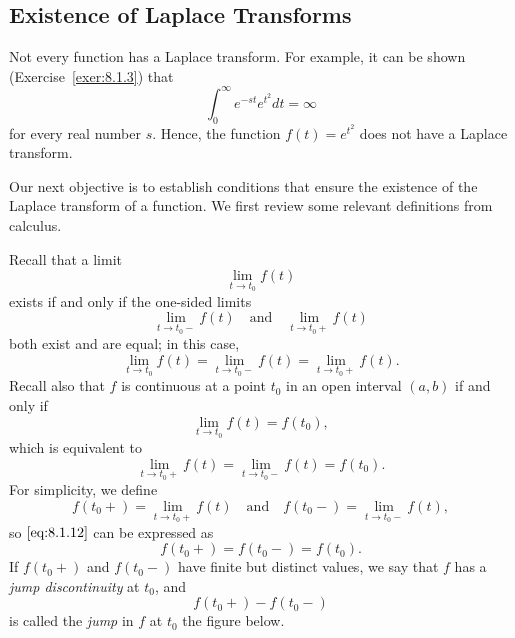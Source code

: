 \documentclass{ximera}
\begin{document}
\subsection*{Existence of Laplace Transforms}

Not every function has a Laplace transform.  For example, it can be shown
(Exercise~\ref{exer:8.1.3}) 
that
$$
\int_0^\infty e^{-st}e^{t^2} dt=\infty
$$
for every real number $s$. Hence, the function $f(t)=e^{t^2}$ does not
have a Laplace transform.

Our next objective is to establish conditions that ensure the
existence of the Laplace transform of a function. We first review some
relevant definitions from calculus.

Recall that a limit
$$
\lim_{t\rightarrow t_0} f(t)
$$
exists if and only if the one-sided limits
$$
\lim_{t\rightarrow t_0-}f(t)\quad\mbox{and}\quad\lim_{t\rightarrow t_0+}f(t)
$$
  both exist and are equal;   in this case,
$$
\lim_{t\rightarrow t_0}f(t)=\lim_{t\rightarrow t_0-}f(t)=\lim_{t\rightarrow t_0+}f(t) .
$$
Recall also that $f$ is continuous at a point $t_0$ in an open interval
$(a,b)$ if and only if
$$
\lim_{t\rightarrow t_0}f(t)=f(t_0),
$$
which is  equivalent to
\begin{equation}\label{eq:8.1.12}
\lim_{t\rightarrow t_0+}f(t)=\lim_{t\rightarrow t_0-}f(t)=f(t_0).
\end{equation}
For simplicity, we  define
$$
f(t_0+)=\lim_{t\rightarrow t_0+}f(t)\quad\mbox{and}\quad f(t_0-)=\lim_{t\rightarrow
t_0-}f(t),
$$
so $\eqref{eq:8.1.12}$ can be expressed as
$$
f(t_0+)=f(t_0-)=f(t_0).
$$
If $f(t_0+)$ and $f(t_0-)$ have finite but distinct values,  we say
that $f$ has a \textit{jump discontinuity}  at $t_0$,
 and
$$
f(t_0+)-f(t_0-)
$$
is called the \textit{jump} in $f$ at $t_0$ the figure below.

\begin{center}
\end{center}
\end{document}
